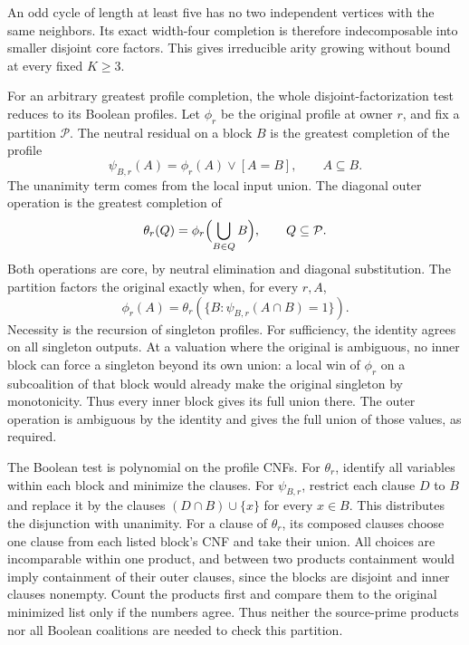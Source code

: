 An odd cycle of length at least five has no two
independent vertices with the same neighbors.
Its exact width-four completion is therefore
indecomposable into smaller disjoint core factors.
This gives irreducible arity growing without bound
at every fixed $K\ge3$.

For an arbitrary greatest profile completion, the
whole disjoint-factorization test reduces to its
Boolean profiles. Let $\phi_r$ be the original
profile at owner $r$, and fix a partition $\mathcal P$.
The neutral residual on a block $B$ is the greatest
completion of the profile
\[
       \psi_{B,r}(A)=\phi_r(A)\lor[A=B],\qquad A\subseteq B.
\]
The unanimity term comes from the local input union.
The diagonal outer operation is the greatest
completion of
\[
       \theta_r(Q)=\phi_r\Bigl(\bigcup_{B\in Q}B\Bigr),
       \qquad Q\subseteq\mathcal P.
\]
Both operations are core, by neutral elimination
and diagonal substitution. The partition factors
the original exactly when, for every $r,A$,
\[
       \phi_r(A)=\theta_r(\{B:\psi_{B,r}(A\cap B)=1\}).
\]
Necessity is the recursion of singleton profiles.
For sufficiency, the identity agrees on all singleton
outputs. At a valuation where the original is
ambiguous, no inner block can force a singleton
beyond its own union: a local win of $\phi_r$ on
a subcoalition of that block would already make
the original singleton by monotonicity. Thus every
inner block gives its full union there. The outer
operation is ambiguous by the identity and gives
the full union of those values, as required.

The Boolean test is polynomial on the profile CNFs.
For $\theta_r$, identify all variables within each
block and minimize the clauses. For $\psi_{B,r}$,
restrict each clause $D$ to $B$ and replace it by
the clauses $(D\cap B)\cup\{x\}$ for every $x\in B$.
This distributes the disjunction with unanimity.
For a clause of $\theta_r$, its composed clauses
choose one clause from each listed block's CNF and
take their union. All choices are incomparable
within one product, and between two products
containment would imply containment of their outer
clauses, since the blocks are disjoint and inner
clauses nonempty. Count the products first and
compare them to the original minimized list only
if the numbers agree. Thus neither the source-prime
products nor all Boolean coalitions are needed to
check this partition.

